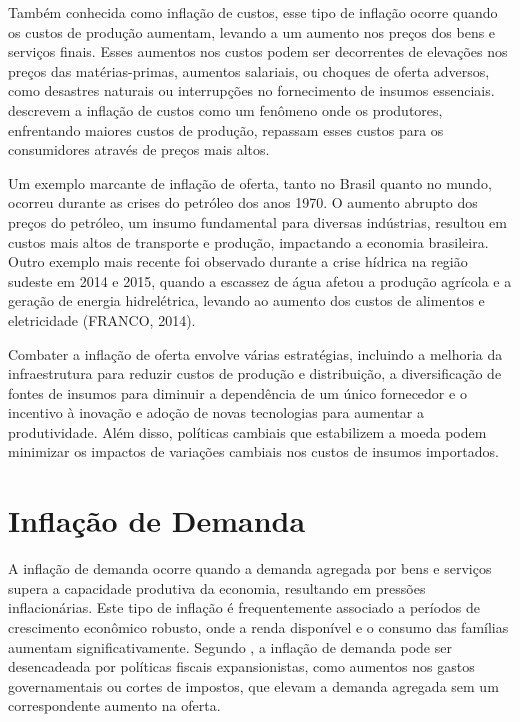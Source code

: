 \documentclass[12pt,oneside,a4paper,chapter=TITLE,english,brazil,sumario=abnt-6027-2012]{abntex2}
\begin{document}
Também conhecida como inflação de custos, esse tipo de inflação ocorre quando os custos de produção aumentam, levando a um aumento nos preços dos bens e serviços finais. Esses aumentos nos custos podem ser decorrentes de elevações nos preços das matérias-primas, aumentos salariais, ou choques de oferta adversos, como desastres naturais ou interrupções no fornecimento de insumos essenciais.  descrevem a inflação de custos como um fenômeno onde os produtores, enfrentando maiores custos de produção, repassam esses custos para os consumidores através de preços mais altos.

Um exemplo marcante de inflação de oferta, tanto no Brasil quanto no mundo, ocorreu durante as crises do petróleo dos anos 1970. O aumento abrupto dos preços do petróleo, um insumo fundamental para diversas indústrias, resultou em custos mais altos de transporte e produção, impactando a economia brasileira. Outro exemplo mais recente foi observado durante a crise hídrica na região sudeste em 2014 e 2015, quando a escassez de água afetou a produção agrícola e a geração de energia hidrelétrica, levando ao aumento dos custos de alimentos e eletricidade (FRANCO, 2014).

Combater a inflação de oferta envolve várias estratégias, incluindo a melhoria da infraestrutura para reduzir custos de produção e distribuição, a diversificação de fontes de insumos para diminuir a dependência de um único fornecedor e o incentivo à inovação e adoção de novas tecnologias para aumentar a produtividade. Além disso, políticas cambiais que estabilizem a moeda podem minimizar os impactos de variações cambiais nos custos de insumos importados. 

\section{Inflação de Demanda}

A inflação de demanda ocorre quando a demanda agregada por bens e serviços supera a capacidade produtiva da economia, resultando em pressões inflacionárias. Este tipo de inflação é frequentemente associado a períodos de crescimento econômico robusto, onde a renda disponível e o consumo das famílias aumentam significativamente. Segundo , a inflação de demanda pode ser desencadeada por políticas fiscais expansionistas, como aumentos nos gastos governamentais ou cortes de impostos, que elevam a demanda agregada sem um correspondente aumento na oferta.
\end{document}
